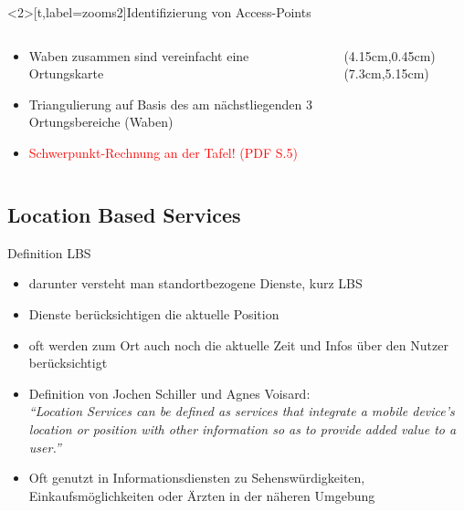 \begin{frame}<2>[t,label=zooms2]{Identifizierung von Access-Points}
  \begin{columns}
  \begin{column}{.4\textwidth}
  \begin{itemize}
  \item Waben zusammen sind vereinfacht eine Ortungskarte
  \item Triangulierung auf Basis des am nächstliegenden 3 Ortungsbereiche (Waben)
  \item \textcolor{red}{Schwerpunkt-Rechnung an der Tafel! (PDF S.5)}
  \end{itemize}
  \end{column}
  \begin{column}{.5\textwidth}
  \begin{center}
  (4.15cm,0.45cm)(7.3cm,5.15cm)
  \end{center}
  \end{column}
  \end{columns}
\end{frame}

\subsection{Location Based Services}
\begin{frame}{Definition LBS}
\begin{itemize}
  \item darunter versteht man standortbezogene Dienste, kurz LBS
  \item Dienste berücksichtigen die aktuelle Position
  \item oft werden zum Ort auch noch die aktuelle Zeit und Infos über den Nutzer berücksichtigt
  \item Definition von Jochen Schiller und Agnes Voisard:\\ \vspace{.5cm}
  \textit{"`Location Services can be defined as services that integrate a mobile device’s location or position with other information so as to provide added value to a user."'}
  \vspace{.5cm}
  \item Oft genutzt in Informationsdiensten zu Sehenswürdigkeiten, Einkaufsmöglichkeiten oder Ärzten in der näheren Umgebung
\end{itemize}
\end{frame}

